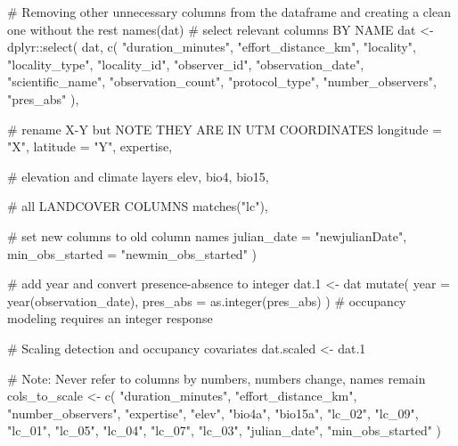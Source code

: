 \documentclass[
]{article}
\newenvironment{Shaded}{}{}
\newcommand{\AlertTok}[1]{\textcolor[rgb]{1.00,0.00,0.00}{#1}}
\newcommand{\CommentTok}[1]{\textcolor[rgb]{0.00,0.50,0.00}{#1}}
\newcommand{\DataTypeTok}[1]{#1}
\newcommand{\FloatTok}[1]{#1}
\newcommand{\KeywordTok}[1]{\textcolor[rgb]{0.00,0.00,1.00}{#1}}
\newcommand{\NormalTok}[1]{#1}
\newcommand{\OperatorTok}[1]{#1}
\newcommand{\StringTok}[1]{\textcolor[rgb]{0.00,0.50,0.50}{#1}}
\begin{document}
\begin{Shaded}
\begin{Highlighting}[]
\CommentTok{# Removing other unnecessary columns from the dataframe and creating a clean one without the rest}
\KeywordTok{names}\NormalTok{(dat)}
\CommentTok{# select relevant columns BY NAME}
\NormalTok{dat <-}\StringTok{ }\NormalTok{dplyr}\OperatorTok{::}\KeywordTok{select}\NormalTok{(}
\NormalTok{  dat,}
  \KeywordTok{c}\NormalTok{(}
    \StringTok{"duration_minutes"}\NormalTok{, }\StringTok{"effort_distance_km"}\NormalTok{, }\StringTok{"locality"}\NormalTok{,}
    \StringTok{"locality_type"}\NormalTok{, }\StringTok{"locality_id"}\NormalTok{, }\StringTok{"observer_id"}\NormalTok{,}
    \StringTok{"observation_date"}\NormalTok{, }\StringTok{"scientific_name"}\NormalTok{, }\StringTok{"observation_count"}\NormalTok{,}
    \StringTok{"protocol_type"}\NormalTok{, }\StringTok{"number_observers"}\NormalTok{, }\StringTok{"pres_abs"}
\NormalTok{  ),}

  \CommentTok{# rename X-Y but }\AlertTok{NOTE}\CommentTok{ THEY ARE IN UTM COORDINATES}
  \DataTypeTok{longitude =} \StringTok{"X"}\NormalTok{, }\DataTypeTok{latitude =} \StringTok{"Y"}\NormalTok{,}
\NormalTok{  expertise,}

  \CommentTok{# elevation and climate layers}
\NormalTok{  elev, bio4, bio15,}

  \CommentTok{# all LANDCOVER COLUMNS}
  \KeywordTok{matches}\NormalTok{(}\StringTok{"lc"}\NormalTok{),}

  \CommentTok{# set new columns to old column names}
  \DataTypeTok{julian_date =} \StringTok{"newjulianDate"}\NormalTok{,}
  \DataTypeTok{min_obs_started =} \StringTok{"newmin_obs_started"}
\NormalTok{)}

\CommentTok{# add year and convert presence-absence to integer}
\NormalTok{dat}\FloatTok{.1}\NormalTok{ <-}\StringTok{ }\NormalTok{dat }\OperatorTok{%
\StringTok{  }\KeywordTok{mutate}\NormalTok{(}
    \DataTypeTok{year =} \KeywordTok{year}\NormalTok{(observation_date),}
    \DataTypeTok{pres_abs =} \KeywordTok{as.integer}\NormalTok{(pres_abs)}
\NormalTok{  ) }\CommentTok{# occupancy modeling requires an integer response}

\CommentTok{# Scaling detection and occupancy covariates}
\NormalTok{dat.scaled <-}\StringTok{ }\NormalTok{dat}\FloatTok{.1}

\CommentTok{# Note: Never refer to columns by numbers, numbers change, names remain}
\NormalTok{cols_to_scale <-}\StringTok{ }\KeywordTok{c}\NormalTok{(}
  \StringTok{"duration_minutes"}\NormalTok{, }\StringTok{"effort_distance_km"}\NormalTok{,}
  \StringTok{"number_observers"}\NormalTok{, }\StringTok{"expertise"}\NormalTok{, }\StringTok{"elev"}\NormalTok{, }\StringTok{"bio4a"}\NormalTok{, }\StringTok{"bio15a"}\NormalTok{, }\StringTok{"lc_02"}\NormalTok{, }\StringTok{"lc_09"}\NormalTok{, }\StringTok{"lc_01"}\NormalTok{, }\StringTok{"lc_05"}\NormalTok{, }\StringTok{"lc_04"}\NormalTok{, }\StringTok{"lc_07"}\NormalTok{, }\StringTok{"lc_03"}\NormalTok{, }\StringTok{"julian_date"}\NormalTok{, }\StringTok{"min_obs_started"}
\NormalTok{)}

}
\end{Highlighting}
\end{Shaded}
\end{document}
